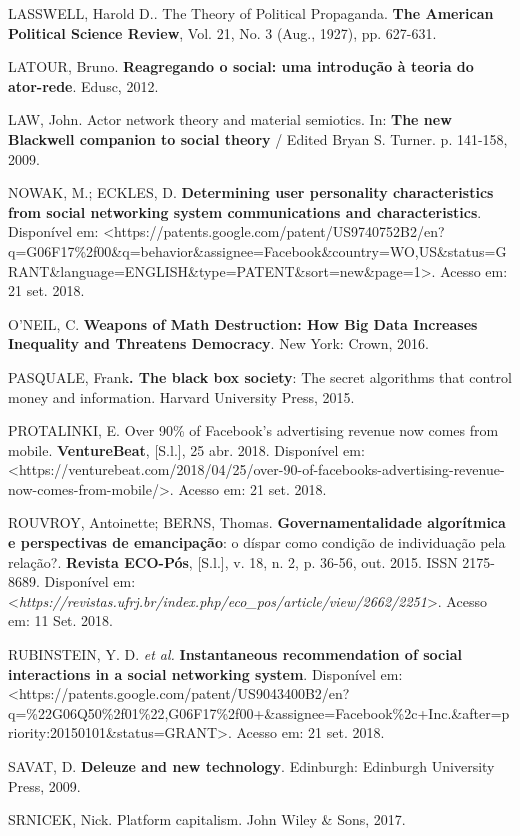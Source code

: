 LASSWELL, Harold D.. The Theory of Political Propaganda. \textbf{The
American Political Science Review}, Vol. 21, No. 3 (Aug., 1927), pp.
627-631.

LATOUR, Bruno. \textbf{Reagregando o social: uma introdução à teoria do
ator-rede}. Edusc, 2012.

LAW, John. Actor network theory and material semiotics. In: \textbf{The
new Blackwell companion to social theory} / Edited Bryan S. Turner. p.
141-158, 2009.

NOWAK, M.; ECKLES, D. \textbf{Determining user personality
characteristics from social networking system communications and
characteristics}. Disponível em:
\textless{}https://patents.google.com/patent/US9740752B2/en?q=G06F17\%2f00\&q=behavior\&assignee=Facebook\&country=WO,US\&status=GRANT\&language=ENGLISH\&type=PATENT\&sort=new\&page=1\textgreater{}.
Acesso em: 21 set. 2018.

O'NEIL, C. \textbf{Weapons of Math Destruction: How Big Data Increases
Inequality and Threatens Democracy}. New York: Crown, 2016.

PASQUALE, Frank\textbf{. The black box society}: The secret algorithms
that control money and information. Harvard University Press, 2015.

PROTALINKI, E. Over 90\% of Facebook's advertising revenue now comes
from mobile. \textbf{VentureBeat}, {[}S.l.{]}, 25 abr. 2018. Disponível
em:
\textless{}https://venturebeat.com/2018/04/25/over-90-of-facebooks-advertising-revenue-now-comes-from-mobile/\textgreater{}.
Acesso em: 21 set. 2018.

ROUVROY, Antoinette; BERNS, Thomas. \textbf{Governamentalidade
algorítmica e perspectivas de emancipação}: o díspar como condição de
individuação pela relação?. \textbf{Revista ECO-Pós}, {[}S.l.{]}, v. 18,
n. 2, p. 36-56, out. 2015. ISSN 2175-8689. Disponível em:
\textless{}\emph{https://revistas.ufrj.br/index.php/eco\_pos/article/view/2662/2251}\textgreater{}.
Acesso em: 11 Set. 2018.

RUBINSTEIN, Y. D. \emph{et al.} \textbf{Instantaneous recommendation of
social interactions in a social networking system}. Disponível em:
\textless{}https://patents.google.com/patent/US9043400B2/en?q=\%22G06Q50\%2f01\%22,G06F17\%2f00+\&assignee=Facebook\%2c+Inc.\&after=priority:20150101\&status=GRANT\textgreater{}.
Acesso em: 21 set. 2018.

SAVAT, D. \textbf{Deleuze and new technology}. Edinburgh: Edinburgh
University Press, 2009.

SRNICEK, Nick. Platform capitalism. John Wiley \& Sons, 2017.

